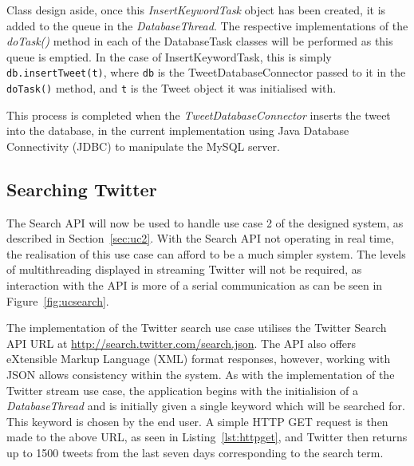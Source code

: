 Class design aside, once this \emph{InsertKeywordTask} object has been created, it is added to the queue in the \emph{DatabaseThread}. The respective implementations of the \emph{doTask()} method in each of the DatabaseTask classes will be performed as this queue is emptied. In the case of InsertKeywordTask, this is simply \texttt{db.insertTweet(t)}, where \texttt{db} is the TweetDatabaseConnector passed to it in the \texttt{doTask()} method, and \texttt{t} is the Tweet object it was initialised with.

This process is completed when the \emph{TweetDatabaseConnector} inserts the tweet into the database, in the current implementation using Java Database Connectivity (JDBC) to manipulate the MySQL server.

\subsection{Searching Twitter}
\label{sec:searchjava}
The Search API will now be used to handle use case 2 of the designed system, as described in Section~\ref{sec:uc2}. With the Search API not operating in real time, the realisation of this use case can afford to be a much simpler system. The levels of multithreading displayed in streaming Twitter will not be required, as interaction with the API is more of a serial communication as can be seen in Figure~\ref{fig:ucsearch}.

The implementation of the Twitter search use case utilises the Twitter Search API URL at \url{http://search.twitter.com/search.json}. The API also offers eXtensible Markup Language (XML) format responses, however, working with JSON allows consistency within the system. As with the implementation of the Twitter stream use case, the application begins with the initialision of a \emph{DatabaseThread} and is initially given a single keyword which will be searched for. This keyword is chosen by the end user. A simple HTTP GET request is then made to the above URL, as seen in Listing~\ref{lst:httpget}, and Twitter then returns up to 1500 tweets from the last seven days corresponding to the search term.

